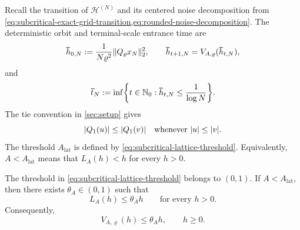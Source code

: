 \documentclass[11pt,reqno,a4paper]{article}
\begin{document}
Recall the transition of $\mathscr H^{(N)}$ and its centered noise decomposition
from \cref{eq:subcritical-exact-grid-transition,eq:rounded-noise-decomposition}.
The deterministic orbit and terminal-scale entrance time are
\begin{equation}\label{eq:subcritical-exact-lattice-orbit}
  \bar h_{0,N}
  :=
  \frac1{N\varrho^2}\norm{Q_\varrho x_N}_2^2,
  \qquad
  \bar h_{t+1,N}
  =
  V_{A,\varrho}(\bar h_{t,N}),
\end{equation}
and
\begin{equation}\label{eq:subcritical-exact-hitting-time}
  \bar t_N
  :=
  \inf\left\{
    t\in\N_0:\bar h_{t,N}\leq\frac1{\log N}
  \right\}.
\end{equation}
The tie convention in \cref{sec:setup} gives
\begin{equation}\label{eq:subcritical-rounding-monotonicity}
  \abs{Q_1(u)}\leq \abs{Q_1(v)}
  \quad\mbox{whenever }\abs u\leq\abs v .
\end{equation}
The threshold $A_{\mathrm{lat}}$ is defined by
\cref{eq:subcritical-lattice-threshold}. Equivalently,
$A<A_{\mathrm{lat}}$ means that $L_A(h)<h$ for every $h>0$.

\begin{lemma}
\label{lem:subcritical-lattice-regimes}
  The threshold in \cref{eq:subcritical-lattice-threshold} belongs to
  $(0,1)$. If $A<A_{\mathrm{lat}}$, then there exists
  $\theta_A\in(0,1)$ such that
  \begin{equation}\label{eq:subcritical-uniform-lattice-contraction}
    L_A(h)\leq \theta_A h
    \qquad\mbox{for every }h>0 .
  \end{equation}
  Consequently,
  \begin{equation}\label{eq:subcritical-exact-lattice-map-contraction}
    V_{A,\varrho}(h)\leq \theta_A h,
    \qquad h\geq0 .
  \end{equation}
\end{lemma}
\end{document}
